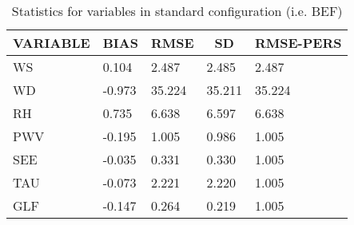 \begin{table}[]
\begin{center}
\begin{tabular}{|l|l|l|l|l|}
\hline
\multicolumn{1}{c|}{\cellcolor[HTML]{C0C0C0}\textbf{VARIABLE}} & \multicolumn{1}{c|}{\cellcolor[HTML]{C0C0C0}\textbf{BIAS}} & \multicolumn{1}{c|}{\cellcolor[HTML]{C0C0C0}\textbf{RMSE}} & \multicolumn{1}{c|}{\cellcolor[HTML]{C0C0C0}\textbf{SD}} & \multicolumn{1}{c|}{\cellcolor[HTML]{C0C0C0}\textbf{RMSE-PERS}}\\\hline
\cellcolor[HTML]{C0C0C0}WS  &     0.104                                &     2.487                                &     2.485  &     2.487 \\
\cellcolor[HTML]{C0C0C0}WD  &    -0.973                                &    35.224                                &    35.211  &    35.224 \\
\cellcolor[HTML]{C0C0C0}RH  &     0.735                                &     6.638                                &     6.597  &     6.638 \\
\cellcolor[HTML]{C0C0C0}PWV &    -0.195                               &     1.005                               &     0.986 &     1.005 \\
\cellcolor[HTML]{C0C0C0}SEE &    -0.035                               &     0.331                               &     0.330 &     1.005 \\
\cellcolor[HTML]{C0C0C0}TAU &    -0.073                               &     2.221                               &     2.220 &     1.005 \\
\cellcolor[HTML]{C0C0C0}GLF &    -0.147                               &     0.264                               &     0.219 &     1.005 \\
\hline
\end{tabular}
\caption{Statistics for variables in standard configuration (i.e. BEF)}
\end{center}
\end{table}
